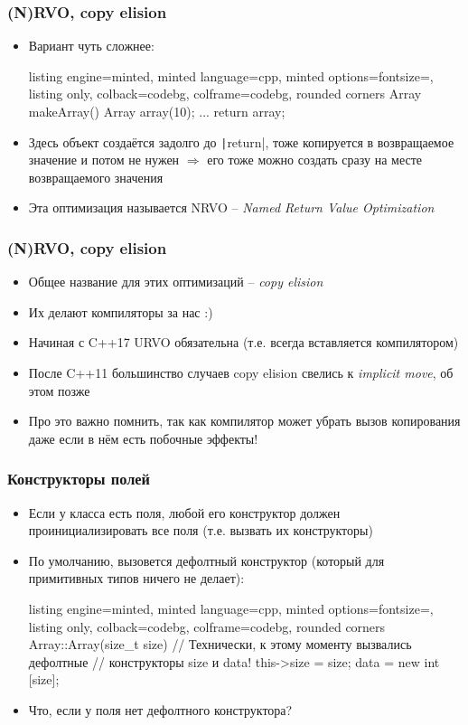 \documentclass[10pt]{beamer}
\begin{document}
\begin{frame}[fragile]
\frametitle{(N)RVO, copy elision}
\begin{itemize}
\item Вариант чуть сложнее:
\begin{tcblisting}{listing engine=minted, minted language=cpp, minted options={fontsize=\scriptsize}, listing only, colback=codebg, colframe=codebg, rounded corners}
Array makeArray() {
  Array array(10);
  ...
  return array;
}
\end{tcblisting}
\pause
{}
\item Здесь объект создаётся задолго до \texttt|return|, тоже копируется в возвращаемое значение и потом не нужен \(\Longrightarrow\) его тоже можно создать сразу на месте возвращаемого значения
\pause
\item Эта оптимизация называется NRVO -- \textit{Named Return Value Optimization}
\end{itemize}
\end{frame}

\begin{frame}[fragile]
\frametitle{(N)RVO, copy elision}
\begin{itemize}
\item Общее название для этих оптимизаций -- \textit{copy elision}
\pause
\item Их делают компиляторы за нас :)
\pause
\item Начиная с C++17 URVO обязательна (т.е. всегда вставляется компилятором)
\pause
\item После C++11 большинство случаев copy elision свелись к \textit{implicit move}, об этом позже
\pause
\item Про это важно помнить, так как компилятор может убрать вызов копирования даже если в нём есть побочные эффекты!
\end{itemize}
\end{frame}

\begin{frame}[fragile]
\frametitle{Конструкторы полей}
\begin{itemize}
\item Если у класса есть поля, любой его конструктор должен проинициализировать все поля (т.е. вызвать их конструкторы)
\pause
\item По умолчанию, вызовется дефолтный конструктор (который для примитивных типов ничего не делает):
\begin{tcblisting}{listing engine=minted, minted language=cpp, minted options={fontsize=\scriptsize}, listing only, colback=codebg, colframe=codebg, rounded corners}
Array::Array(size_t size) {
  // Технически, к этому моменту вызвались дефолтные
  // конструкторы size и data!
  this->size = size;
  data = new int [size];
}
\end{tcblisting}
\pause
\item Что, если у поля нет дефолтного конструктора?
\end{itemize}
\end{frame}
\end{document}
